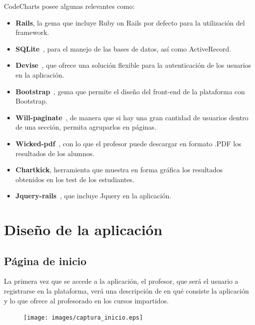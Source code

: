CodeCharts posee algunas relevantes como:

\begin{itemize}
    \item \textbf{Rails}, la gema que incluye Ruby on Rails por defecto para la utilización del framework.
    \item \textbf{SQLite}~\cite{SQLite}, para el manejo de las bases de datos, así como ActiveRecord.
    \item \textbf{Devise}~\cite{Devise}, que ofrece una solución flexible para la autenticación de los usuarios en la aplicación.
    \item \textbf{Bootstrap}~\cite{BootstrapGem}, gema que permite el diseño del front-end de la plataforma con Bootstrap.
    \item \textbf{Will-paginate}~\cite{Paginate}, de manera que si hay una gran cantidad de usuarios dentro de una sección, permita agruparlos en páginas.
    \item \textbf{Wicked-pdf}~\cite{WickedPDF}, con lo que el profesor puede descargar en formato .PDF los resultados de los alumnos.
    \item \textbf{Chartkick}, herramienta que muestra en forma gráfica los resultados obtenidos en los test de los estudiantes.
    \item \textbf{Jquery-rails}~\cite{JqueryRails}, que incluye Jquery en la aplicación. 
\end{itemize}


\section{Diseño de la aplicación}
\label{1:sec:2}

\subsection{Página de inicio}
\label{1:sec:1}

La primera vez que se accede a la aplicación, el profesor, que será el usuario a registrarse en la plataforma, verá una descripción de en qué consiste la aplicación y lo que ofrece al profesorado en los cursos impartidos.

\begin{figure}[!th]
\begin{center}
\texttt{[image: images/captura\_inicio.eps]}
\label{fig:11}
\end{center}
\end{figure}

